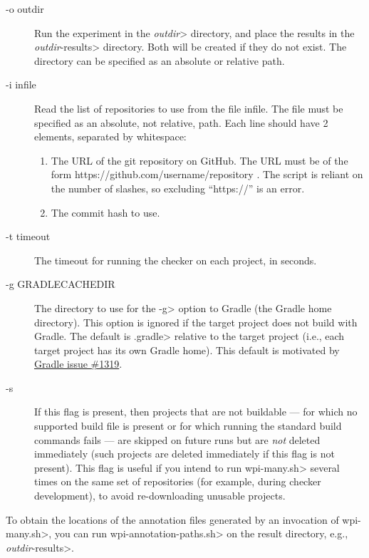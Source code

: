 \begin{description}
\item[-o outdir]
  Run the experiment in the \<\emph{outdir}> directory, and place the results in
  the \<\emph{outdir}-results> directory. Both will be created if they do not
  exist.  The directory can be specified as an absolute or relative path.

\item[-i infile]
  Read the list of repositories to use from the file infile.
  The file must be specified as an absolute, not relative, path.
  Each line
  should have 2 elements, separated by whitespace:
  \begin{enumerate}
  \item
    The URL of the git repository on GitHub. The URL must be of the form
    https://github.com/username/repository .  The script is reliant on the
    number of slashes, so excluding ``https://'' is an error.
  \item The commit hash to use.
  \end{enumerate}

\item[-t timeout]
  The timeout for running the checker on each project, in seconds.

\item[-g GRADLECACHEDIR]
  The directory to use for the \<-g> option to Gradle (the Gradle home
  directory). This option is ignored if the target project does not
  build with Gradle. The default is \<.gradle> relative to the target
  project (i.e., each target project has its own Gradle home). This default
  is motivated by
  \href{https://github.com/gradle/gradle/issues/1319}{Gradle issue \#1319}.

\item[-s]
  If this flag is present, then projects that are not buildable --- for which
  no supported build file is present or for which running the standard build
  commands fails --- are skipped on future runs but are \emph{not} deleted immediately
  (such projects are deleted immediately if this flag is not present). This flag is useful
  if you intend to run \<wpi-many.sh> several times on the same set of repositories
  (for example, during checker development), to avoid re-downloading unusable projects.

\end{description}

To obtain the locations of the annotation files generated by an invocation of
\<wpi-many.sh>, you can run \<wpi-annotation-paths.sh> on the result directory,
e.g., \<\emph{outdir}-results>.

